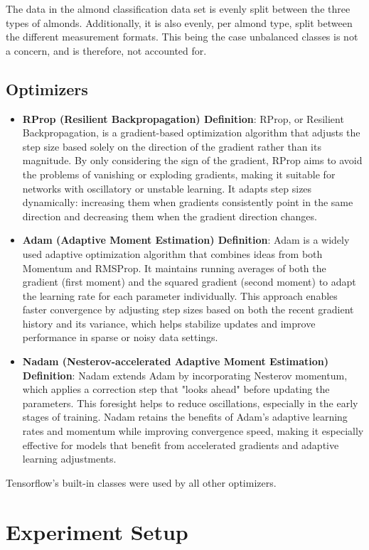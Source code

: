 \documentclass[conference]{IEEEtran}
\begin{document}
The data in the almond classification data set is evenly split between the three types of almonds. Additionally, it is also evenly, per almond type, split between the different measurement formats. This being the case unbalanced classes is not a concern, and is therefore, not accounted for. 

\subsection{Optimizers}

\begin{itemize}
    \item \textbf{RProp (Resilient Backpropagation) Definition}: RProp, or Resilient Backpropagation, is a gradient-based optimization algorithm that adjusts the step size based solely on the direction of the gradient rather than its magnitude. By only considering the sign of the gradient, RProp aims to avoid the problems of vanishing or exploding gradients, making it suitable for networks with oscillatory or unstable learning. It adapts step sizes dynamically: increasing them when gradients consistently point in the same direction and decreasing them when the gradient direction changes.
    \item \textbf{Adam (Adaptive Moment Estimation) Definition}: Adam is a widely used adaptive optimization algorithm that combines ideas from both Momentum and RMSProp. It maintains running averages of both the gradient (first moment) and the squared gradient (second moment) to adapt the learning rate for each parameter individually. This approach enables faster convergence by adjusting step sizes based on both the recent gradient history and its variance, which helps stabilize updates and improve performance in sparse or noisy data settings.
    \item \textbf{Nadam (Nesterov-accelerated Adaptive Moment Estimation) Definition}: Nadam extends Adam by incorporating Nesterov momentum, which applies a correction step that "looks ahead" before updating the parameters. This foresight helps to reduce oscillations, especially in the early stages of training. Nadam retains the benefits of Adam's adaptive learning rates and momentum while improving convergence speed, making it especially effective for models that benefit from accelerated gradients and adaptive learning adjustments.
\end{itemize}
Tensorflow's built-in classes were used by all other optimizers.

\section{Experiment Setup}
\end{document}
